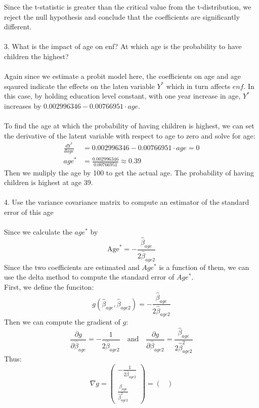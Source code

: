 \documentclass[12pt]{article}
\begin{document}
\begin{flushleft}
Since the t-statistic is greater than the critical value from the t-distribution, we reject the null hypothesis and conclude that the coefficients are significantly different.\\~\\
3. What is the impact of age on enf? At which age is the probability to have children the
highest?\\~\\
Again since we estimate a probit model here, the coefficients on age and age sqaured indicate the effects on the laten variable $Y^*$ which in turn affects $enf$. In this case, by holding education level constant, with one year increase in age, $Y^*$ increases by $0.002996346-0.00766951\cdot age$.\\~\\
To find the age at which the probability of having children is highest, we can set the derivative of the latent variable with respect to age to zero and solve for age:
\begin{align*}
\frac{dY^*}{dage} &= 0.002996346-0.00766951\cdot age = 0\\
age^* &= \frac{0.002996346}{0.00766951} \approx 0.39
\end{align*}
Then we muliply the age by 100 to get the actual age. The probability of having children is highest at age 39.\\~\\
4. Use the variance covariance matrix to compute an estimator of the standard error of this age\\~\\
Since we calculate the $age^*$ by 
\[
\text{Age}^* = -\frac{\hat{\beta}_{age}}{2\hat{\beta}_{age2}}
\]
Since the two coefficients are estimated and $Age^*$ is a function of them, we can use the delta method to compute the standard error of $Age^*$.\\
First, we define the funciton:
\[
g(\hat{\beta}_{age}, \hat{\beta}_{age2}) = -\frac{\hat{\beta}_{age}}{2\hat{\beta}_{age2}}
\]
Then we can compute the gradient of $g$:
\[
\frac{\partial g}{\partial \hat{\beta}_{age}} = -\frac{1}{2\hat{\beta}_{age2}}
\quad \text{and} \quad
\frac{\partial g}{\partial \hat{\beta}_{age2}} = \frac{\hat{\beta}_{age}}{2\hat{\beta}_{age2}^2}
\]
Thus:
\[
\nabla g =
\begin{pmatrix}
-\frac{1}{2\hat{\beta}_{age2}} \\
\frac{\hat{\beta}_{age}}{\hat{\beta}_{age2}^2}
\end{pmatrix}
=
\begin{pmatrix}

\end{pmatrix}\]
\end{flushleft}
\end{document}
